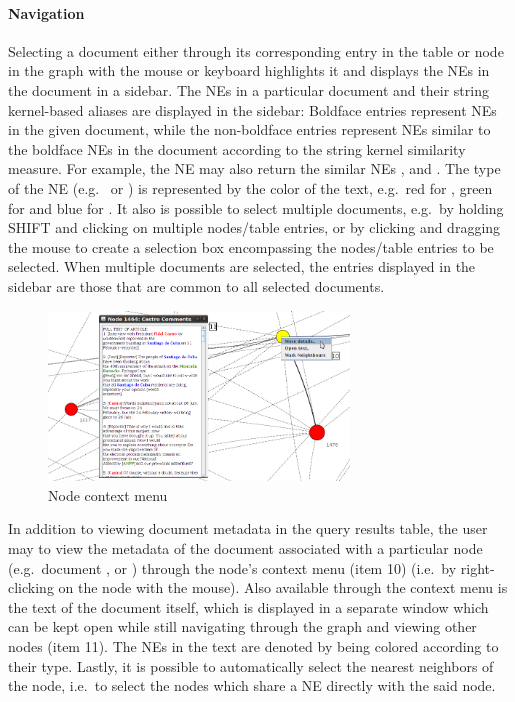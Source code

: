 \paragraph{Navigation}
Selecting a document either through its corresponding entry in the table or node in the graph with the mouse or keyboard highlights it and displays the NEs in the document in a sidebar. The NEs in a particular document and their string kernel-based aliases are displayed in the sidebar: Boldface entries represent NEs in the given document, while the non-boldface entries represent NEs similar to the boldface NEs in the document according to the string kernel similarity measure. For example, the NE \textbf{} may also return the similar NEs ,  and . The type of the NE (e.g.\  or ) is represented by the color of the text, e.g.\ red for , green for  and blue for . It also is possible to select multiple documents, e.g.\ by holding SHIFT and clicking on multiple nodes/table entries, or by clicking and dragging the mouse to create a selection box encompassing the nodes/table entries to be selected. When multiple documents are selected, the entries displayed in the sidebar are those that are common to all selected documents.

\begin{figure}[h]
\centering
\caption{Node context menu}
\includegraphics[width=80mm]{nodeclick.png}
\end{figure}

In addition to viewing document metadata in the query results table, the user may to view the metadata of the document associated with a particular node (e.g.\ document ,  or ) through the node's context menu (item 10) (i.e.\ by right-clicking on the node with the mouse). Also available through the context menu is the text of the document itself, which is displayed in a separate window which can be kept open while still navigating through the graph and viewing other nodes (item 11). The NEs in the text are denoted by being colored according to their type. Lastly, it is possible to automatically select the nearest neighbors of the node, i.e.\ to select the nodes which share a NE directly with the said node.

